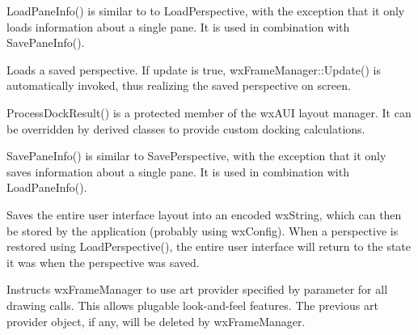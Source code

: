 \label{wxframemanagerloadpaneinfo}


LoadPaneInfo() is similar to to LoadPerspective, with the exception that it only loads information about a single pane.  It is used in combination with SavePaneInfo().

\label{wxframemanagerloadperspective}


Loads a saved perspective. If update is true, wxFrameManager::Update()
is automatically invoked, thus realizing the saved perspective on screen.

\label{wxframemanagerprocessdockresult}


ProcessDockResult() is a protected member of the wxAUI layout manager.  It can be overridden by derived classes to provide custom docking calculations.

\label{wxframemanagersavepaneinfo}


SavePaneInfo() is similar to SavePerspective, with the exception that it only saves information about a single pane.  It is used in combination with LoadPaneInfo().

\label{wxframemanagersaveperspective}


Saves the entire user interface layout into an encoded wxString, which
can then be stored by the application (probably using wxConfig). When
a perspective is restored using LoadPerspective(), the entire user
interface will return to the state it was when the perspective was saved.

\label{wxframemanagersetartprovider}


Instructs wxFrameManager to use art provider specified by parameter
 for all drawing calls. This allows plugable
look-and-feel features. The previous art provider object, if any,
will be deleted by wxFrameManager.


